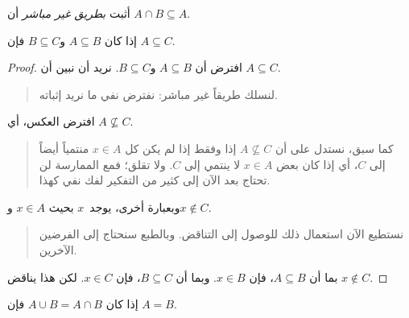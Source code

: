\documentclass[../../../include/open-logic-section]{subfiles}
\begin{document}
\begin{prob}
أثبت \emph{بطريق غير مباشر} أن $A \cap B \subseteq A$.
\end{prob}

\begin{prop}
إذا كان $A \subseteq B$ و$B \subseteq C$ فإن $A \subseteq C$.
\end{prop}

\begin{proof}
  افترض أن $A \subseteq B$ و$B \subseteq C$. نريد أن نبين أن
  $A \subseteq C$.
  \begin{quote}
    لنسلك طريقاً غير مباشر: نفترض نفي ما نريد إثباته.
  \end{quote}
  افترض العكس، أي $A \nsubseteq C$.
  \begin{quote}
    كما سبق، نستدل على أن $A \nsubseteq C$ إذا وفقط إذا لم يكن كل
    $x \in A$ منتمياً أيضاً إلى $C$، أي إذا كان بعض $x \in A$ لا ينتمي
    إلى $C$. ولا تقلق؛ فمع الممارسة لن تحتاج بعد الآن إلى كثير من التفكير
    لفك نفي كهذا.
  \end{quote}
  وبعبارة أخرى، يوجد~$x$ بحيث $x \in A$ و$x \notin C$.
  \begin{quote}
    نستطيع الآن استعمال ذلك للوصول إلى التناقض. وبالطبع سنحتاج إلى
    الفرضين الآخرين.
  \end{quote}
  بما أن $A \subseteq B$، فإن $x \in B$. وبما أن $B \subseteq C$،
  فإن $x \in C$. لكن هذا يناقض $x \notin C$.
\end{proof}

\begin{prop}
إذا كان $A \cup B = A \cap B$ فإن $A = B$.
\end{prop}
\end{document}
